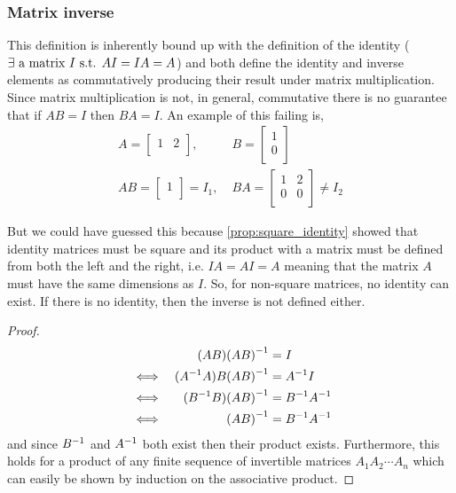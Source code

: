 \documentclass[MathsNotesBase.tex]{subfiles}
\begin{document}
{		\bigskip
		\subsubsection{Matrix inverse}
		
		\medskip
		This definition is inherently bound up with the definition of the identity ($\exists \text{ a matrix } I \text{ s.t. } AI = IA = A$) and both define the identity and inverse elements as commutatively producing their result under matrix multiplication. Since matrix multiplication is not, in general, commutative there is no guarantee that if $AB = I$ then $BA = I$. An example of this failing is,
		\begin{align*}
			A = 
			\begin{bmatrix}
			1 & 2 \\
			\end{bmatrix},\;
			&B =
			\begin{bmatrix}
			1 \\
			0 \\
			\end{bmatrix}
			\\[10pt]
			AB = 
			\begin{bmatrix}
			1 \\
			\end{bmatrix} = I_1,\;
			&BA =
			\begin{bmatrix}
			1 & 2 \\
			0 & 0 \\
			\end{bmatrix} \neq I_2
		\end{align*}
		
		But we could have guessed this because \autoref{prop:square_identity} showed that identity matrices must be square and its product with a matrix must be defined from both the left and the right, i.e. $IA = AI = A$ meaning that the matrix $A$ must have the same dimensions as $I$. So, for non-square matrices, no identity can exist. If there is no identity, then the inverse is not defined either.
		
		\medskip
		\begin{proof}
		\begin{align*}
		& 	  &	(AB){(AB)}^{-1} &= I \\
		&\iff &	({A}^{-1}A)B{(AB)}^{-1} &= {A}^{-1}I \\
		&\iff &	({B}^{-1}B){(AB)}^{-1} &= {B}^{-1}{A}^{-1} \\
		&\iff &	{(AB)}^{-1} &= {B}^{-1}{A}^{-1} \\
		\end{align*}
		and since ${B}^{-1}$ and ${A}^{-1}$ both exist then their product exists.
		Furthermore, this holds for a product of any finite sequence of invertible matrices $A_1A_2\cdots A_n$ which can easily be shown by induction on the associative product.
		\end{proof}
	}
\end{document}
